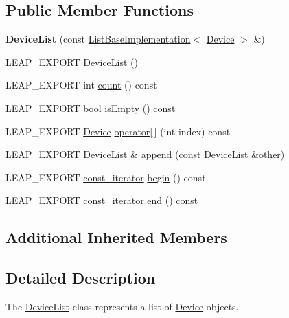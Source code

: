 \subsection*{Public Member Functions}
\begin{DoxyCompactItemize}
\item 
\mbox{\label{class_leap_1_1_device_list_a5526b7741f4a2689c330d34fc7a865db}} 
{\bfseries Device\+List} (const \hyperlink{class_leap_1_1_list_base_implementation}{List\+Base\+Implementation}$<$ \hyperlink{class_leap_1_1_device}{Device} $>$ \&)
\item 
L\+E\+A\+P\+\_\+\+E\+X\+P\+O\+RT \hyperlink{class_leap_1_1_device_list_a6b438e4f4e9486c9d38e6ac01a9e7b93}{Device\+List} ()
\item 
L\+E\+A\+P\+\_\+\+E\+X\+P\+O\+RT int \hyperlink{class_leap_1_1_device_list_a2a62cf3b681aef4342d3f5fe309a7d61}{count} () const
\item 
L\+E\+A\+P\+\_\+\+E\+X\+P\+O\+RT bool \hyperlink{class_leap_1_1_device_list_a6dd3954b95415db108f1afcc4fba0041}{is\+Empty} () const
\item 
L\+E\+A\+P\+\_\+\+E\+X\+P\+O\+RT \hyperlink{class_leap_1_1_device}{Device} \hyperlink{class_leap_1_1_device_list_a82c41ea0a7175aca06d00bfb2505ee4f}{operator\mbox{[}$\,$\mbox{]}} (int index) const
\item 
L\+E\+A\+P\+\_\+\+E\+X\+P\+O\+RT \hyperlink{class_leap_1_1_device_list}{Device\+List} \& \hyperlink{class_leap_1_1_device_list_aa5a6dd4fcc38029bfd381e34bcae4c43}{append} (const \hyperlink{class_leap_1_1_device_list}{Device\+List} \&other)
\item 
L\+E\+A\+P\+\_\+\+E\+X\+P\+O\+RT \hyperlink{class_leap_1_1_device_list_acfe5b07cda502759bf8fe768e8c6ba87}{const\+\_\+iterator} \hyperlink{class_leap_1_1_device_list_ad388e702535f69c3d09c699cb13f7e1e}{begin} () const
\item 
L\+E\+A\+P\+\_\+\+E\+X\+P\+O\+RT \hyperlink{class_leap_1_1_device_list_acfe5b07cda502759bf8fe768e8c6ba87}{const\+\_\+iterator} \hyperlink{class_leap_1_1_device_list_aa725ececd31b45086dde456b810c178d}{end} () const
\end{DoxyCompactItemize}
\subsection*{Additional Inherited Members}


\subsection{Detailed Description}
The \hyperlink{class_leap_1_1_device_list}{Device\+List} class represents a list of \hyperlink{class_leap_1_1_device}{Device} objects.

